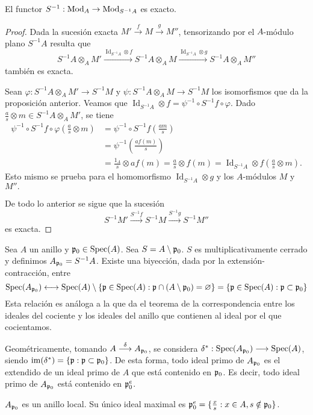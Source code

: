 \documentclass[../main.tex]{subfiles}
\begin{document}
	\begin{corollary}
		El functor $S^{-1}:\operatorname{Mod}_A \to \operatorname{Mod}_{S^{-1}A}$ es exacto.
	\end{corollary}
	\begin{proof}
		Dada la sucesión exacta $M'\overset{f}{\longrightarrow}M\overset{g}{\longrightarrow}M''$, tensorizando por el $A$-módulo plano $S^{-1}A$ resulta que
		$$S^{-1}A\otimes_AM'\overset{\operatorname{Id}_{S^{-1}A}\otimes f}{\longrightarrow}S^{-1}A\otimes_AM\overset{\operatorname{Id}_{S^{-1}A}\otimes g}{\longrightarrow}S^{-1}A\otimes_AM''$$
		también es exacta.

		Sean $\varphi:S^{-1}A\otimes_AM'\longrightarrow S^{-1}M$ y $\psi:S^{-1}A\otimes_AM\longrightarrow S^{-1}M$ los isomorfismos que da la proposición anterior. Veamos que $\operatorname{Id}_{S^{-1}A}\otimes f=\psi^{-1}\circ S^{-1}f\circ \varphi.$ Dado $\frac{a}{s}\otimes m\in S^{-1}A\otimes_A M'$, se tiene
		\begin{align*}
		\psi^{-1}\circ S^{-1}f\circ \varphi\left(\frac{a}{s}\otimes m\right)&=\psi^{-1}\circ S^{-1}f\left(\frac{am}{s}\right)\\
		&=\psi^{-1}\left(\frac{af(m)}{s}\right)\\
		&=\frac{1_A}{s}\otimes af(m)=\frac{a}{s}\otimes f(m)=\operatorname{Id}_{S^{-1}A}\otimes f\left(\frac{a}{s}\otimes m\right).
		\end{align*}
		Esto mismo se prueba para el homomorfismo $\operatorname{Id}_{S^{-1}A}\otimes g$ y los $A$-módulos $M$ y $M''.$

		De todo lo anterior se sigue que la sucesión
		$$S^{-1}M'\overset{S^{-1}f}{\longrightarrow}S^{-1}M\overset{S^{-1}g}{\longrightarrow}S^{-1}M''$$
		es exacta.
	\end{proof}
	\begin{example}
Sea $A$ un anillo y $\mathfrak{p}_0\in \operatorname{Spec}(A)$. Sea $S=A\setminus\mathfrak{p}_0$. $S$ es multiplicativamente cerrado y definimos $A_{\mathfrak{p}_0}=S^{-1}A$. Existe una biyección, dada por la extensión-contracción, entre $$\operatorname{Spec}(A_{\mathfrak{p}_0})\longleftrightarrow \operatorname{Spec}(A)\setminus\{\mathfrak{p}\in \operatorname{Spec}(A):\mathfrak{p}\cap(A\setminus\mathfrak{p}_0)=\varnothing\}=\{\mathfrak{p}\in \operatorname{Spec}(A):\mathfrak{p}\subset\mathfrak{p}_0\}$$
Esta relación es análoga a la que da el teorema de la correspondencia entre los ideales del cociente y los ideales del anillo que contienen al ideal por el que cocientamos.

Geométricamente, tomando $A\overset{\delta}{\longrightarrow}A_{\mathfrak{p}_0}$, se considera $\delta^{\ast}:\operatorname{Spec}(A_{\mathfrak{p}_0})\longrightarrow \operatorname{Spec}(A)$, siendo $\operatorname{im}(\delta^{\ast})=\{\mathfrak{p}:\mathfrak{p}\subset \mathfrak{p}_0\}$. De esta forma, todo ideal primo de $A_{\mathfrak{p}_0}$ es el extendido de un ideal primo de $A$ que está contenido en $\mathfrak{p}_0$. Es decir, todo ideal primo de $A_{\mathfrak{p}_0}$ está contenido en $\mathfrak{p}_0^e$.

$A_{\mathfrak{p}_0}$ es un anillo local. Su único ideal maximal es $\mathfrak{p}_0^e=\{\frac{x}{s}:x\in A, s\notin\mathfrak{p}_0\}$.
\end{example}
\end{document}
